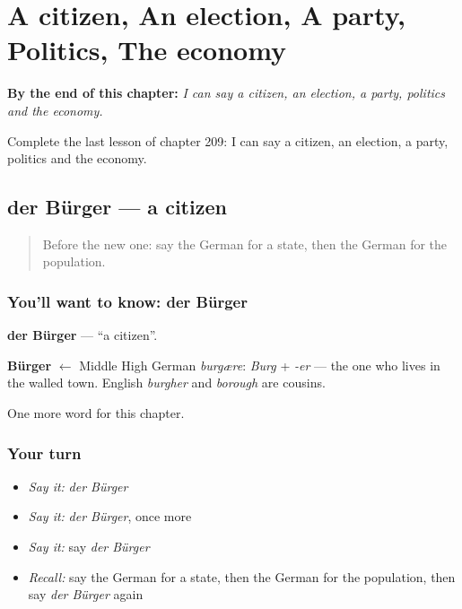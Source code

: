 
\chapter{A citizen, An election, A party, Politics, The economy}
\label{ch:ge-a-citizen-an-election-a-party-politics-the-economy}

\begin{chapteropening}
\textbf{By the end of this chapter:} \emph{I can say a citizen, an election, a party, politics and the economy.}

Complete the last lesson of chapter 209: I can say a citizen, an election, a party, politics and the economy.
\end{chapteropening}

\section[der Bürger]{der Bürger — a citizen}

\label{lesson:GE-C209-buerger}



\begin{quote}
Before the new one: say the German for a state, then the German for the population.
\end{quote}

\subsection*{You'll want to know: der Bürger}
\textbf{der Bürger} — \textquotedblleft{}a citizen\textquotedblright{}.

\begin{cousinweb}
\textbf{Bürger} $\leftarrow$ Middle High German \emph{burgære}: \emph{Burg} + \emph{-er} — the one who lives in the walled town. English \emph{burgher} and \emph{borough} are cousins.
\end{cousinweb}

\begin{grammarlens}[title={What you've built}]
One more word for this chapter.
\end{grammarlens}

\subsection*{Your turn}
\begin{itemize}
\raggedright
  \item \emph{Say it:} \emph{der Bürger}
  \item \emph{Say it:} \emph{der Bürger}, once more
  \item \emph{Say it:} say \emph{der Bürger}
  \item \emph{Recall:} say the German for a state, then the German for the population, then say \emph{der Bürger} again
\end{itemize}

